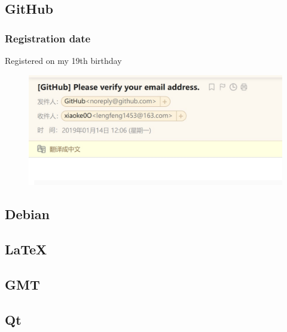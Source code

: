 \subsection{GitHub}
\begin{frame}
    \frametitle{Registration date}
    Registered on my 19th birthday
\begin{figure}
    \includegraphics[width=\linewidth]{Assets/github.jpg}
\end{figure}
    

\end{frame}
\subsection{Debian}
\subsection{\LaTeX}
\subsection{GMT}
\subsection{Qt}
